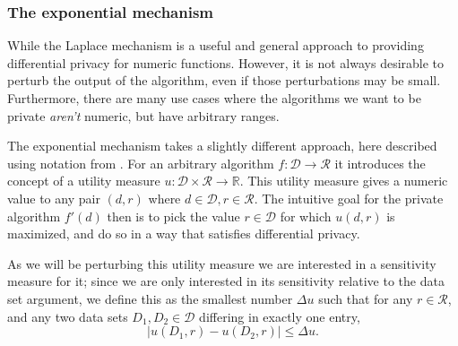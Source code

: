 \documentclass[12pt]{article}
\newcommand{\fancy}{\mathcal}
\begin{document}
\subsubsection{The exponential mechanism}

While the Laplace mechanism is a useful and general approach to providing differential privacy for numeric functions. However, it is not always desirable to perturb the output of the algorithm, even if those perturbations may be small. Furthermore, there are many use cases where the algorithms we want to be private \emph{aren't} numeric, but have arbitrary ranges.

The exponential mechanism \cite{sherry_exponentialmech} takes a slightly different approach, here described using notation from \cite{dwork_privacybook}. For an arbitrary algorithm $f : \fancy{D} \to \fancy{R}$ it introduces the concept of a utility measure $u : \fancy{D} \times \fancy{R} \to \mathbb{R}$. This utility measure gives a numeric value to any pair $(d,r)$ where $d \in \fancy{D}, r \in \fancy{R}$. The intuitive goal for the private algorithm $f'(d)$ then is to pick the value $r \in \fancy{D}$ for which $u(d,r)$ is maximized, and do so in a way that satisfies differential privacy.

As we will be perturbing this utility measure we are interested in a sensitivity measure for it; since we are only interested in its sensitivity relative to the data set argument, we define this as the smallest number $\Delta u$ such that for any $r \in \fancy{R}$, and any two data sets $D_1,D_2 \in \fancy{D}$ differing in exactly one entry,
\begin{equation}\label{eq:utility_sensitivity}
    |u(D_1,r) - u(D_2,r)| \leq \Delta u.
\end{equation}
\end{document}
